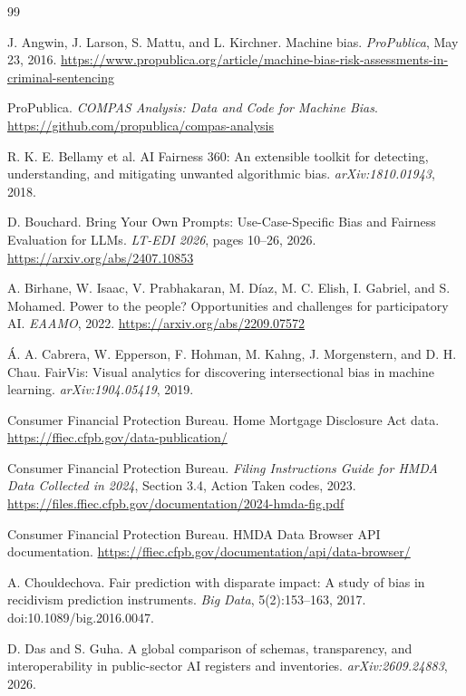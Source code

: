 \documentclass[10pt]{article}
\begin{document}
\begin{thebibliography}{99}

J. Angwin, J. Larson, S. Mattu, and L. Kirchner.
Machine bias.
\emph{ProPublica}, May 23, 2016.
\url{https://www.propublica.org/article/machine-bias-risk-assessments-in-criminal-sentencing}

ProPublica.
\emph{COMPAS Analysis: Data and Code for Machine Bias}.
\url{https://github.com/propublica/compas-analysis}

R. K. E. Bellamy et al.
AI Fairness 360: An extensible toolkit for detecting, understanding, and
mitigating unwanted algorithmic bias.
\emph{arXiv:1810.01943}, 2018.

D. Bouchard.
Bring Your Own Prompts: Use-Case-Specific Bias and Fairness Evaluation for LLMs.
\emph{LT-EDI 2026}, pages 10--26, 2026.
\url{https://arxiv.org/abs/2407.10853}

A. Birhane, W. Isaac, V. Prabhakaran, M. D\'iaz, M. C. Elish, I. Gabriel,
and S. Mohamed.
Power to the people? Opportunities and challenges for participatory AI.
\emph{EAAMO}, 2022. \url{https://arxiv.org/abs/2209.07572}

\'A. A. Cabrera, W. Epperson, F. Hohman, M. Kahng, J. Morgenstern, and
D. H. Chau.
FairVis: Visual analytics for discovering intersectional bias in machine
learning.
\emph{arXiv:1904.05419}, 2019.

Consumer Financial Protection Bureau.
Home Mortgage Disclosure Act data.
\url{https://ffiec.cfpb.gov/data-publication/}

Consumer Financial Protection Bureau.
\emph{Filing Instructions Guide for HMDA Data Collected in 2024},
Section 3.4, Action Taken codes, 2023.
\url{https://files.ffiec.cfpb.gov/documentation/2024-hmda-fig.pdf}

Consumer Financial Protection Bureau.
HMDA Data Browser API documentation.
\url{https://ffiec.cfpb.gov/documentation/api/data-browser/}

A. Chouldechova.
Fair prediction with disparate impact: A study of bias in recidivism prediction
instruments.
\emph{Big Data}, 5(2):153--163, 2017.
doi:10.1089/big.2016.0047.

D. Das and S. Guha.
A global comparison of schemas, transparency, and interoperability in
public-sector AI registers and inventories.
\emph{arXiv:2609.24883}, 2026.


\end{thebibliography}
\end{document}

